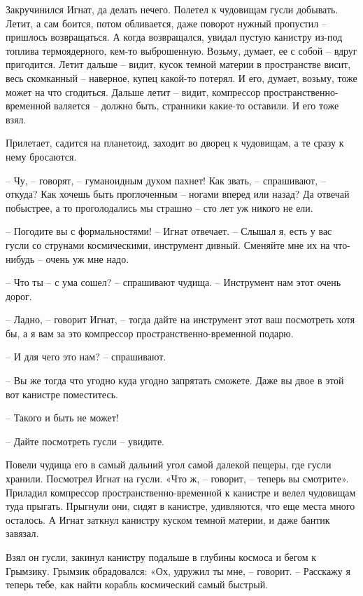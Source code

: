 \documentclass[ebook,oneside,final,openright]{memoir}
\begin{document}
\par
Закручинился Игнат, да делать нечего. Полетел к чудовищам гусли добывать. Летит, а сам боится, потом обливается, даже поворот нужный пропустил – пришлось возвращаться. А когда возвращался, увидал пустую канистру из-под топлива термоядерного, кем-то выброшенную. Возьму, думает, ее с собой – вдруг пригодится. Летит дальше – видит, кусок темной материи в пространстве висит, весь скомканный – наверное, купец какой-то потерял. И его, думает, возьму, тоже может на что сгодиться. Дальше летит – видит, компрессор пространственно-временной валяется – должно быть, странники какие-то оставили. И его тоже взял.\par
\par
Прилетает, садится на планетоид, заходит во дворец к чудовищам, а те сразу к нему бросаются. \par
– Чу, – говорят, – гуманоидным духом пахнет! Как звать, – спрашивают, – откуда? Как хочешь быть проглоченным – ногами вперед или назад? Да отвечай побыстрее, а то проголодались мы страшно – сто лет уж никого не ели.\par
– Погодите вы с формальностями! – Игнат отвечает. – Слышал я, есть у вас гусли со струнами космическими, инструмент дивный. Сменяйте мне их на что-нибудь – очень уж мне надо.\par
– Что ты – с ума сошел? – спрашивают чудища. – Инструмент нам этот очень дорог.\par
– Ладно, – говорит Игнат, – тогда дайте на инструмент этот ваш посмотреть хотя бы, а я вам за это компрессор пространственно-временной подарю.\par
– И для чего это нам? – спрашивают.\par
– Вы же тогда что угодно куда угодно запрятать сможете. Даже вы двое в этой вот канистре поместитесь. \par
– Такого и быть не может!\par
– Дайте посмотреть гусли – увидите.\par
\par
Повели чудища его в самый дальний угол самой далекой пещеры, где гусли хранили. Посмотрел Игнат на гусли. «Что ж, – говорит, – теперь вы смотрите». Приладил компрессор пространственно-временной к канистре и велел чудовищам туда прыгать. Прыгнули они, сидят в канистре, удивляются, что еще места много осталось. А Игнат заткнул канистру куском темной материи, и даже бантик завязал.\par
\par
Взял он гусли, закинул канистру подальше в глубины космоса и бегом к Грымзику. Грымзик обрадовался: «Ох, удружил ты мне, – говорит. – Расскажу я теперь тебе, как найти корабль космический самый быстрый.\par
\end{document}
